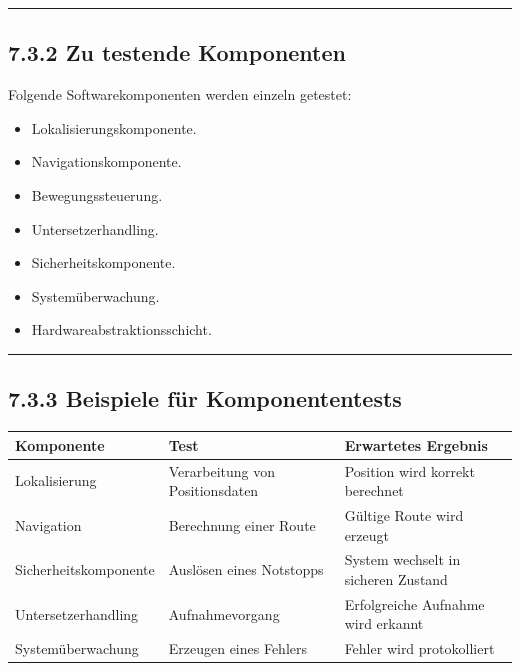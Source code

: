 \documentclass[
  a4paper,
  12pt,
  DIV=12,        %
  parskip=half,  %
  headings=small %
]{scrartcl}
\theoremstyle{definition}
\providecommand{\tightlist}{%
  \setlength{\itemsep}{0pt}\setlength{\parskip}{0pt}}
\theoremstyle{definition}
\providecommand{\tightlist}{%
  \setlength{\itemsep}{0pt}\setlength{\parskip}{0pt}}
\begin{document}
\begin{center}\rule{0.5\linewidth}{0.5pt}\end{center}

\subsection{7.3.2 Zu testende
Komponenten}\label{zu-testende-komponenten}

Folgende Softwarekomponenten werden einzeln getestet:

\begin{itemize}
\tightlist
\item
  Lokalisierungskomponente.
\item
  Navigationskomponente.
\item
  Bewegungssteuerung.
\item
  Untersetzerhandling.
\item
  Sicherheitskomponente.
\item
  Systemüberwachung.
\item
  Hardwareabstraktionsschicht.
\end{itemize}

\begin{center}\rule{0.5\linewidth}{0.5pt}\end{center}

\subsection{7.3.3 Beispiele für
Komponententests}\label{beispiele-fuxfcr-komponententests}

\begin{longtable}[]{@{}
  >{\raggedright\arraybackslash}p{}
  >{\raggedright\arraybackslash}p{}
  >{\raggedright\arraybackslash}p{}@{}}
\toprule\noalign{}
\begin{minipage}[b]{\linewidth}\raggedright
Komponente
\end{minipage} & \begin{minipage}[b]{\linewidth}\raggedright
Test
\end{minipage} & \begin{minipage}[b]{\linewidth}\raggedright
Erwartetes Ergebnis
\end{minipage} \\
\midrule\noalign{}
\endhead
\bottomrule\noalign{}
\endlastfoot
Lokalisierung & Verarbeitung von Positionsdaten & Position wird korrekt
berechnet \\
Navigation & Berechnung einer Route & Gültige Route wird erzeugt \\
Sicherheitskomponente & Auslösen eines Notstopps & System wechselt in
sicheren Zustand \\
Untersetzerhandling & Aufnahmevorgang & Erfolgreiche Aufnahme wird
erkannt \\
Systemüberwachung & Erzeugen eines Fehlers & Fehler wird
protokolliert \\
\end{longtable}
\end{document}
